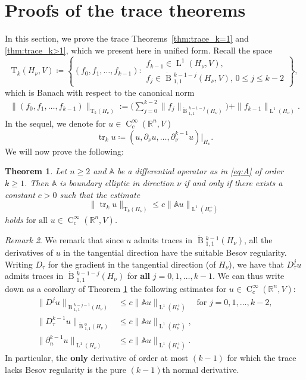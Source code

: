 \documentclass[a4paper,10pt]{amsart}
\newcommand{\R}{\mathbb R}
\renewcommand{\leq}{\leqslant}
\DeclareMathOperator{\tr}{tr}
\newcommand{\lebe}{\operatorname{L}}
\newcommand{\hold}{\operatorname{C}}
\newcommand{\A}{\mathbb{A}}
\newcommand{\besov}{\operatorname{B}}
\numberwithin{equation}{section}
\newtheorem{theorem}{Theorem}[section]
\theoremstyle{remark}
\newtheorem{remark}[theorem]{Remark}
\numberwithin{equation}{section}
\begin{document}
	\section{Proofs of the trace theorems}\label{sec:trace}
	In this section, we prove the trace Theorems~\ref{thm:trace_k=1} and \ref{thm:trace_k>1}, which we present here in unified form. Recall the space 
	$$
	\mathrm{T}_k(H_\nu ,V) \coloneqq \left\{(f_0,f_1,\ldots,f_{k-1})\colon \begin{array}{c}f_{k-1}\in\lebe^1(H_\nu ,V),\\ f_j\in\dot{\besov}{^{k-1-j}_{1,1}}(H_\nu ,V),\,0\leq j\leq k-2 \end{array} \right\},
	$$
	which is Banach with respect to the canonical norm
	\begin{align*}
		\|(f_0,f_1,\ldots,f_{k-1}) \|_{\mathrm{T}_{k}(H_{\nu})}:= \Big(\sum_{j=0}^{k-2} \|f_{j}\|_{{\dot{\besov}}{_{1,1}^{k-1-j}}(H_\nu)} \Big) + \|f_{k-1}\|_{\lebe^{1}(H_{\nu})}.
	\end{align*}
	In the sequel, we denote for $u\in\hold_{c}^{\infty}(\R^{n},V)$
	$$
	\tr_k u\coloneqq(u,\partial_\nu u,\ldots,\partial_\nu^{k-1}u)\big|_{H_\nu}.
	$$
	We will now prove the following:
	\begin{theorem}\label{thm:trace_unified}
		Let \(n \ge 2\) and $\A$ be a differential operator as in \eqref{eq:A}  of order $k\geq 1$. Then $\A$ is boundary elliptic in direction $\nu$ if and only if there exists a constant $c>0$ such that the estimate
		$$
		\|\tr_k u\|_{\mathrm T_k(H_\nu)}\leq c\|\A u\|_{\lebe^1(H_\nu^+)}
		$$
		holds $\text{for all }u\in\hold^\infty_c(\R^n,V)$.
	\end{theorem}
	\begin{remark}\label{rmk:traces}
		We remark that since $u$ admits traces in $\dot{\besov}{^{k-1}_{1,1}}(H_\nu)$, all the derivatives of $u$ in the tangential direction have the suitable Besov regularity. Writing $D_\tau$ for the gradient in the tangential direction (of $H_\nu$), we have that $D_\tau^j u$ admits traces in $\dot{\besov}{^{k-1-j}_{1,1}}(H_\nu)$ for \textbf{all} $j=0,1,\ldots, k-1$. We can thus write down as a corollary of Theorem \ref{thm:trace_unified} the following estimates for $u\in\hold^\infty_c(\R^n,V)$:
		\begin{align*}
			\|D^j u\|_{{\dot{\besov}}{^{k-j-1}_{1,1}}(H_{\nu})}&\leq c\|\A u\|_{\lebe^1(H_{\nu}^{+})}\quad\text{for }j=0,1,\ldots, k-2,\\
			\|D_\tau^{k-1} u\|_{{\dot{\besov}}{^{0}_{1,1}}(H_{\nu})}&\leq c\|\A u\|_{\lebe^1(H_{\nu}^{+})},\\
			\|\partial_n^{k-1} u\|_{\lebe^1(H_{\nu})}&\leq c\|\A u\|_{\lebe^1(H_{\nu}^{+})}.
		\end{align*}
		In particular, the \textbf{only}  derivative of order at most $(k-1)$ for which the trace lacks Besov regularity is the pure $(k-1)$th normal derivative.
	\end{remark}
	
\end{document}
